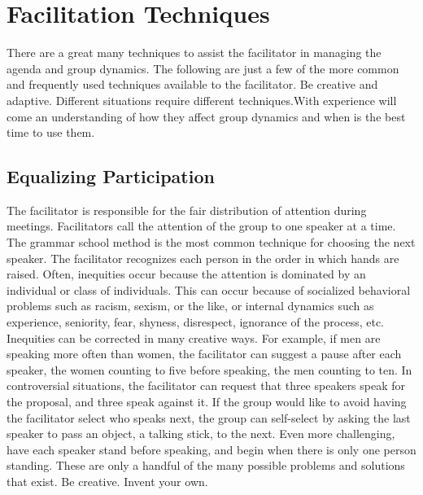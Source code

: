\section{Facilitation Techniques}
There are a great many techniques to assist the facilitator in
managing the agenda and group dynamics. The following are just a
few of the more common and frequently used techniques available to
the facilitator. Be creative and adaptive. Different situations
require different techniques.With experience will come an
understanding of how they affect group dynamics and when is the
best time to use them.

\subsection{Equalizing Participation}

The facilitator is responsible for the fair distribution of
attention during meetings. Facilitators call the attention of the
group to one speaker at a time. The grammar school method is the
most common technique for choosing the next speaker. The
facilitator recognizes each person in the order in which hands are
raised. Often, inequities occur because the attention is dominated
by an individual or class of individuals. This can occur because of
socialized behavioral problems such as racism, sexism, or the
like, or internal dynamics such as experience, seniority, fear,
shyness, disrespect, ignorance of the process, etc. Inequities can
be corrected in many creative ways. For example, if men are
speaking more often than women, the facilitator can suggest a pause
after each speaker, the women counting to five before speaking, the
men counting to ten. In controversial situations, the
facilitator can request that three speakers speak for the proposal,
and three speak against it. If the group would like to avoid having
the facilitator select who speaks next, the group can self-select
by asking the last speaker to pass an object, a talking stick, to
the next. Even more challenging, have each speaker stand before
speaking, and begin when there is only one person standing. These
are only a handful of the many possible problems and solutions that
exist. Be creative. Invent your own.

